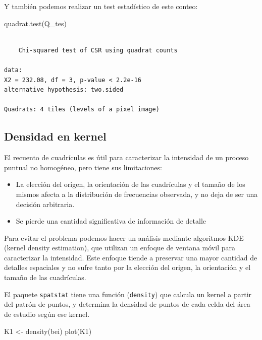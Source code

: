 \documentclass[
  letterpaper,
  DIV=11,
  numbers=noendperiod]{scrreprt}
\newenvironment{Shaded}{\begin{snugshade}}{\end{snugshade}}
\newcommand{\FunctionTok}[1]{\textcolor[rgb]{0.28,0.35,0.67}{#1}}
\newcommand{\NormalTok}[1]{\textcolor[rgb]{0.00,0.23,0.31}{#1}}
\newcommand{\OtherTok}[1]{\textcolor[rgb]{0.00,0.23,0.31}{#1}}
\providecommand{\tightlist}{%
  \setlength{\itemsep}{0pt}\setlength{\parskip}{0pt}}\usepackage{longtable,booktabs,array}
\begin{document}
Y también podemos realizar un test estadístico de este conteo:

\begin{Shaded}
\begin{Highlighting}[]
\FunctionTok{quadrat.test}\NormalTok{(Q\_tes)}
\end{Highlighting}
\end{Shaded}

\begin{verbatim}

    Chi-squared test of CSR using quadrat counts

data:  
X2 = 232.08, df = 3, p-value < 2.2e-16
alternative hypothesis: two.sided

Quadrats: 4 tiles (levels of a pixel image)
\end{verbatim}

\hypertarget{densidad-en-kernel}{%
\subsection{Densidad en kernel}\label{densidad-en-kernel}}

El recuento de cuadrículas es útil para caracterizar la intensidad de un
proceso puntual no homogéneo, pero tiene sus limitaciones:

\begin{itemize}
\tightlist
\item
  La elección del origen, la orientación de las cuadrículas y el tamaño
  de los mismos afecta a la distribución de frecuencias observada, y no
  deja de ser una decisión arbitraria.
\item
  Se pierde una cantidad significativa de información de detalle
\end{itemize}

Para evitar el problema podemos hacer un análisis mediante algoritmos
KDE (kernel density estimation), que utilizan un enfoque de ventana
móvil para caracterizar la intensidad. Este enfoque tiende a preservar
una mayor cantidad de detalles espaciales y no sufre tanto por la
elección del origen, la orientación y el tamaño de las cuadrículas.

El paquete \texttt{spatstat} tiene una función (\texttt{density}) que
calcula un kernel a partir del patrón de puntos, y determina la densidad
de puntos de cada celda del área de estudio según ese kernel.

\begin{Shaded}
\begin{Highlighting}[]
\NormalTok{K1 }\OtherTok{\textless{}{-}} \FunctionTok{density}\NormalTok{(bei) }
\FunctionTok{plot}\NormalTok{(K1)}
\end{Highlighting}
\end{Shaded}
\end{document}

